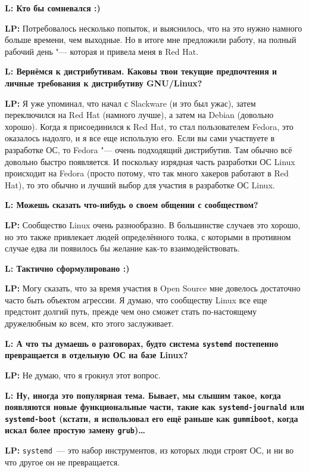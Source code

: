 \documentclass[10pt, a5paper]{article}
\begin{document}
\begin{Parallel}[p]{}{}
{{\noindent \bf L: Кто бы сомневался :)}

{\noindent \bf LP:} Потребовалось несколько попыток, и выяснилось, что на это нужно намного больше времени, чем выходные. Но в итоге мне предложили работу, на полный рабочий день "--- которая и привела меня в Red Hat.

{\noindent \bf L: Вернёмся к дистрибутивам. Каковы твои текущие предпочтения и личные требования к дистрибутиву GNU/Linux? }

{\noindent \bf LP:} Я уже упоминал, что начал с Slackware (и это был ужас), затем переключился на Red Hat (намного лучше), а затем на Debian (довольно хорошо). Когда я присоединился к Red Hat, то стал пользователем Fedora, это оказалось надолго, и я все еще использую его. Если вы сами участвуете в разработке ОС, то Fedora "--- очень подходящий дистрибутив. Там обычно всё довольно быстро появляется. И поскольку изрядная часть разработки ОС Linux происходит на Fedora (просто потому, что так много хакеров работают в Red Hat), то это обычно и лучший выбор для участия в разработке ОС Linux.

{\noindent \bf L:  Можешь сказать что-нибудь о своем общении с сообществом?}

{\noindent \bf LP:} Сообщество Linux очень разнообразно. В большинстве случаев это хорошо, но это также привлекает людей определённого толка, с которыми в противном случае едва ли появилось бы желание как-то взаимодействовать. 

{\noindent \bf L: Тактично сформулировано :) }

{\noindent \bf LP:}  Могу сказать, что за время участия в Open Source мне довелось достаточно часто быть объектом агрессии. Я думаю, что сообществу Linux все еще предстоит долгий путь, прежде чем оно сможет стать по-настоящему дружелюбным ко всем, кто этого заслуживает.

{\noindent \bf L: А что ты думаешь о разговорах, будто система \verb!systemd! постепенно превращается в отдельную ОС на базе Linux? }

{\noindent \bf LP:} Не думаю, что я грокнул этот вопрос.

{\noindent \bf L: Ну, иногда это популярная тема. Бывает, мы слышим такое, когда появляются новые функциональные части, такие как \verb!systemd-journald! или \verb!systemd-boot! (кстати, я использовал его ещё раньше как \verb!gummiboot!, когда искал более простую замену \verb!grub!)\ldots }

{\noindent \bf LP:} \verb!systemd!~--- это набор инструментов, из которых люди строят ОС, и ни во что другое он не превращается.

}
\end{Parallel}
\end{document}
